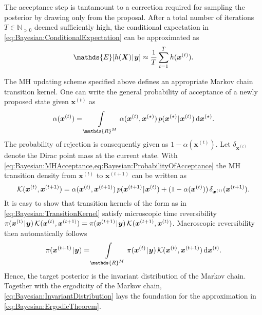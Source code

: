The acceptance step is tantamount to a correction required for sampling the posterior by drawing only from the proposal.
After a total number of iterations \(T \in \mathds{N}_{>0}\) deemed sufficiently high, the conditional expectation in \cref{eq:Bayesian:ConditionalExpectation} can be approximated as
\begin{equation} \label{eq:Bayesian:ErgodicTheorem}
  \mathds{E}[h(\bm{X}) \cond \bm{y}] \approx \frac{1}{T} \sum\limits_{t=1}^T h(\bm{x}^{(t)}).
\end{equation}
\par %
The MH updating scheme specified above defines an appropriate Markov chain transition kernel.
One can write the general probability of acceptance of a newly proposed state given \(\bm{x}^{(t)}\) as
\begin{equation} \label{eq:Bayesian:ProbabilityOfAcceptance}
  \alpha(\bm{x}^{(t)}) = \int\limits_{\mathds{R}^\dimParam} \alpha(\bm{x}^{(t)}, \bm{x}^{(\star)}) \, p(\bm{x}^{(\star)} \cond \bm{x}^{(t)}) \, \mathrm{d} \bm{x}^{(\star)}.
\end{equation}
The probability of rejection is consequently given as \(1 - \alpha(\bm{x}^{(t)})\).
Let \(\delta_{\bm{x}^{(t)}}\) denote the Dirac point mass at the current state.
With \cref{eq:Bayesian:MHAcceptance,eq:Bayesian:ProbabilityOfAcceptance} the MH transition density from \(\bm{x}^{(t)}\) to \(\bm{x}^{(t+1)}\) can be written as
\begin{equation} \label{eq:Bayesian:TransitionKernel}
  \mathcal{K}(\bm{x}^{(t)},\bm{x}^{(t+1)})
  = \alpha(\bm{x}^{(t)}, \bm{x}^{(t+1)}) \, p(\bm{x}^{(t+1)} {\:\!}|{\:\!} \bm{x}^{(t)}) + (1 - \alpha(\bm{x}^{(t)})) \, \delta_{\bm{x}^{(t)}}(\bm{x}^{(t+1)}).
\end{equation}
It is easy to show that transition kernels of the form as in \cref{eq:Bayesian:TransitionKernel} satisfy microscopic time reversibility
\(\pi(\bm{x}^{(t)} {\:\!}|{\:\!} \bm{y}) \, \mathcal{K}(\bm{x}^{(t)},\bm{x}^{(t+1)}) = \pi(\bm{x}^{(t+1)} {\:\!}|{\:\!} \bm{y}) \, \mathcal{K}(\bm{x}^{(t+1)},\bm{x}^{(t)})\).
Macroscopic reversibility then automatically follows
\begin{equation} \label{eq:Bayesian:InvariantDistribution}
  \pi(\bm{x}^{(t+1)} \cond \bm{y}) = \int\limits_{\mathds{R}^\dimParam} \pi(\bm{x}^{(t)} \cond \bm{y}) \, \mathcal{K}(\bm{x}^{(t)},\bm{x}^{(t+1)}) \, \mathrm{d} \bm{x}^{(t)}.
\end{equation}
Hence, the target posterior is the invariant distribution of the Markov chain.
Together with the ergodicity of the Markov chain, \cref{eq:Bayesian:InvariantDistribution} lays the foundation for the approximation in \cref{eq:Bayesian:ErgodicTheorem}.
